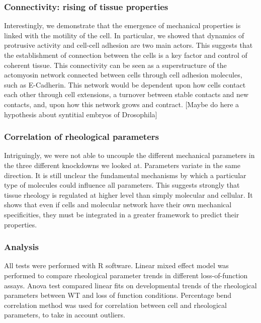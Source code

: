 \subsubsection{Connectivity: rising of tissue properties}
Interestingly, we demonstrate that the emergence of mechanical properties is linked with the motility of the cell.
In particular, we showed that dynamics of protrusive activity and cell-cell adhesion are two main actors.
This suggests that the establishment of connection between the cells is a key factor and control of coherent tissue.
This connectivity can be seen as a superstructure of the actomyosin network connected between cells through cell adhesion molecules, such as E-Cadherin.
This network would be dependent upon how cells contact each other through cell extensions, a turnover between stable contacts and new contacts, and, upon how this network grows and contract.
[Maybe do here a hypothesis about syntitial embryos of Drosophila]

\subsubsection{Correlation of rheological parameters}
Intriguingly, we were not able to uncouple the different mechanical parameters in the three different knockdowns we looked at.
Parameters variate in the same direction.
It is still unclear the fundamental mechanisms by which a particular type of molecules could influence all parameters.
This suggests strongly that tissue rheology is regulated at higher level than simply molecular and cellular.
It shows that even if cells and molecular network have their own mechanical specificities, they must be integrated in a greater framework to predict their properties.

\subsubsection{Analysis}
All tests were performed with R software.
Linear mixed effect model was performed to compare rheological parameter trends in different loss-of-function assays.
Anova test compared linear fits on developmental trends of the rheological parameters between WT and loss of function conditions.
Percentage bend correlation method was used for correlation between cell and rheological parameters, to take in account outliers.
